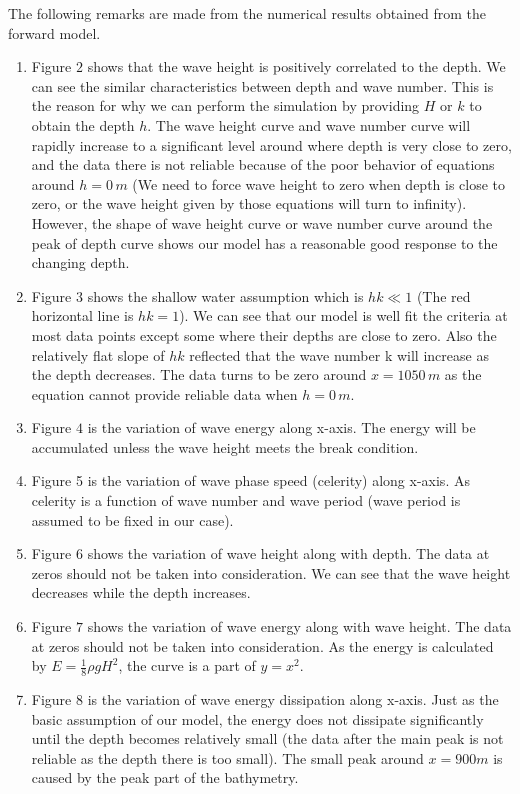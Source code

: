 The following remarks are made from the numerical results obtained from the forward model.
\begin{enumerate}
\item Figure $2$ shows that the wave height is positively correlated to the depth. We can see the similar characteristics between depth and wave number. This is the reason for why we can perform the simulation by providing ${H}$ or ${k}$ to obtain the depth ${h}$. The wave height curve and wave number curve will rapidly increase to a significant level around where depth is very close to zero, and the data there is not reliable because of the poor behavior of equations around $h=0 \,m$ (We need to force wave height to zero when depth is close to zero, or the wave height given by those equations will turn to infinity). However, the shape of wave height curve or wave number curve around the peak of depth curve shows our model has a reasonable good response to the changing depth.

\item Figure $3$ shows the shallow water assumption which is $hk\ll 1$ (The red horizontal line is $hk=1$). We can see that our model is well fit the criteria at most data points except some where their depths are close to zero. Also the relatively flat slope of $hk$ reflected that the wave number k will increase as the depth decreases. The data turns to be zero around $x = 1050 \,m$ as the equation cannot provide reliable data when $h = 0 \,m$.

\item Figure $4$ is the variation of wave energy along x-axis. The energy will be accumulated unless the wave height meets the break condition.

\item Figure 5 is the variation of wave phase speed (celerity) along x-axis. As celerity is a function of wave number and wave period (wave period is assumed to be fixed in our case).

\item Figure $6$ shows the variation of wave height along with depth. The data at zeros should not be taken into consideration. We can see that the wave height decreases while the depth increases.

\item Figure $7$ shows the variation of wave energy along with wave height. The data at zeros should not be taken into consideration. As the energy is calculated by $E=\frac{1}{8}\rho g H^2$, the curve is a part of $y=x^2$.

\item Figure $8$ is the variation of wave energy dissipation along x-axis. Just as the basic assumption of our model, the energy does not dissipate significantly until the depth becomes relatively small (the data after the main peak is not reliable as the depth there is too small). The small peak around $x=900 m$ is caused by the peak part of the bathymetry.
\end{enumerate}